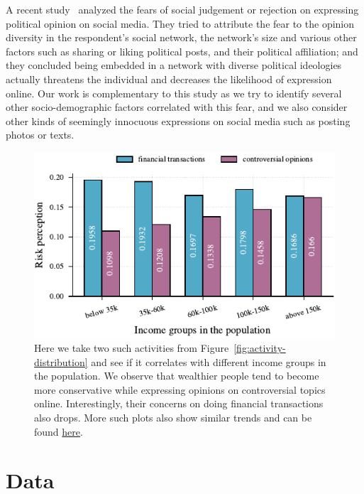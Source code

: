 \documentclass{article}
\theoremstyle{plain}
\theoremstyle{definition}
\theoremstyle{remark}
\begin{document}
A recent study~\citep{weeks2024too} analyzed the fears of social judgement or rejection on expressing political opinion on social media. They tried to attribute the fear to the opinion diversity in the respondent's social network, the network's size and various other factors such as sharing or liking political posts, and their political affiliation; and they concluded being embedded in a network with diverse political ideologies actually threatens the individual and decreases the likelihood of expression online. Our work is complementary to this study as we try to identify several other socio-demographic factors correlated with this fear, and we also consider other kinds of seemingly innocuous expressions on social media such as posting photos or texts.

\begin{figure}[t]
\includegraphics{tex/figures/income_bar_2021.pdf}
    \caption{Here we take two such activities from Figure~\ref{fig:activity-distribution} and see if it correlates with different income groups in the population. We observe that wealthier people tend to become more conservative while expressing opinions on controversial topics online. Interestingly, their concerns on doing financial transactions also drops. More such plots also show similar trends and can be found \href{https://datalitproject1.streamlit.app/}{here}.}
    \label{fig:income-activity-distribution}
\end{figure}


\section{Data}\label{sec:data}
\end{document}
